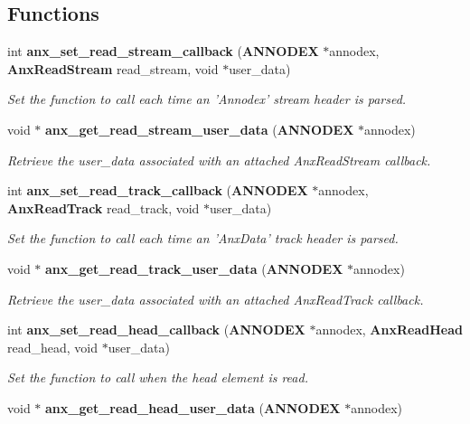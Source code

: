\subsection*{Functions}
\begin{CompactItemize}
\item 
int {\bf anx\_\-set\_\-read\_\-stream\_\-callback} ({\bf ANNODEX} $\ast$annodex, {\bf Anx\-Read\-Stream} read\_\-stream, void $\ast$user\_\-data)
\begin{CompactList}\small\item\em Set the function to call each time an 'Annodex' stream header is parsed. \item\end{CompactList}\item 
void $\ast$ {\bf anx\_\-get\_\-read\_\-stream\_\-user\_\-data} ({\bf ANNODEX} $\ast$annodex)
\begin{CompactList}\small\item\em Retrieve the user\_\-data associated with an attached Anx\-Read\-Stream callback. \item\end{CompactList}\item 
int {\bf anx\_\-set\_\-read\_\-track\_\-callback} ({\bf ANNODEX} $\ast$annodex, {\bf Anx\-Read\-Track} read\_\-track, void $\ast$user\_\-data)
\begin{CompactList}\small\item\em Set the function to call each time an 'Anx\-Data' track header is parsed. \item\end{CompactList}\item 
void $\ast$ {\bf anx\_\-get\_\-read\_\-track\_\-user\_\-data} ({\bf ANNODEX} $\ast$annodex)
\begin{CompactList}\small\item\em Retrieve the user\_\-data associated with an attached Anx\-Read\-Track callback. \item\end{CompactList}\item 
int {\bf anx\_\-set\_\-read\_\-head\_\-callback} ({\bf ANNODEX} $\ast$annodex, {\bf Anx\-Read\-Head} read\_\-head, void $\ast$user\_\-data)
\begin{CompactList}\small\item\em Set the function to call when the head element is read. \item\end{CompactList}\item 
void $\ast$ {\bf anx\_\-get\_\-read\_\-head\_\-user\_\-data} ({\bf ANNODEX} $\ast$annodex)

\end{CompactItemize}
